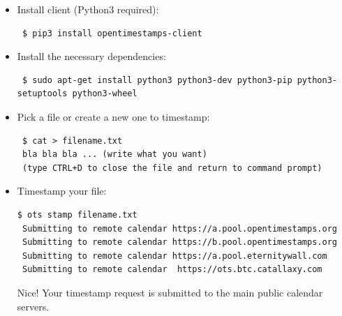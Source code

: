 \begin{itemize}
\item Install client (Python3 required):\bigskip
\begin{lstlisting}
 $ pip3 install opentimestamps-client
\end{lstlisting}
\item Install the necessary dependencies:\bigskip
\begin{lstlisting}
 $ sudo apt-get install python3 python3-dev python3-pip python3-setuptools python3-wheel
\end{lstlisting}
\item Pick a file or create a new one to timestamp:\bigskip
\begin{lstlisting}
 $ cat > filename.txt
 bla bla bla ... (write what you want)
 (type CTRL+D to close the file and return to command prompt)
\end{lstlisting}
\item Timestamp your file:\bigskip
\begin{lstlisting}[breakatwhitespace=true]
 $ ots stamp filename.txt 
 Submitting to remote calendar https://a.pool.opentimestamps.org
 Submitting to remote calendar https://b.pool.opentimestamps.org
 Submitting to remote calendar https://a.pool.eternitywall.com
 Submitting to remote calendar  https://ots.btc.catallaxy.com
\end{lstlisting}
Nice! Your timestamp request is submitted to the main public calendar servers.


\end{itemize}
